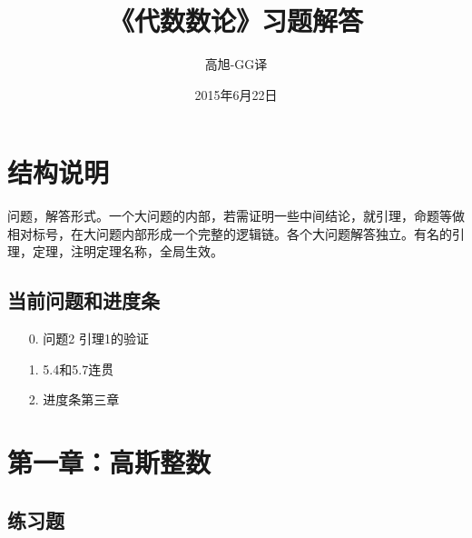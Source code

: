\documentclass[UTF8]{ctexart}
\begin{document}
\tableofcontents

\title{《代数数论》习题解答}
\author{高旭-GG译}
\date{2015年6月22日}
\maketitle

\section{结构说明}
问题，解答形式。一个大问题的内部，若需证明一些中间结论，就引理，命题等做相对标号，在大问题内部形成一个完整的逻辑链。各个大问题解答独立。有名的引理，定理，注明定理名称，全局生效。

\subsection{当前问题和进度条}
\begin{itemize}
    \item[0.] 问题2 引理1的验证
    \item[1.] 5.4和5.7连贯
    \item[2.] 进度条第三章
\end{itemize}

\section{第一章：高斯整数}

\subsection{练习题}
\end{document}
